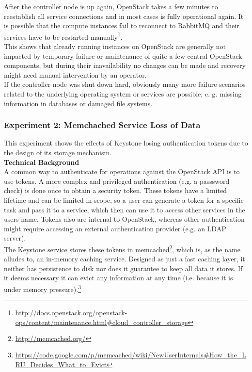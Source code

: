After the controller node is up again, OpenStack takes a few minutes to reestablish all service connections and in most cases is fully operational again. It is possible that the compute instances fail to reconnect to RabbitMQ and their services have to be restarted manually\footnote{\url{http://docs.openstack.org/openstack-ops/content/maintenance.html\#cloud_controller_storage}}. \\

This shows that already running instances on OpenStack are generally not impacted by temporary failure or maintenance of quite a few central OpenStack components, but during their inavailability no changes can be made and recovery might need manual intervention by an operator. \\

If the controller node was shut down hard, obviously many more failure scenarios related to the underlying operating system or services are possible, e. g. missing information in databases or damaged file systems.\\

\subsubsection{Experiment 2: Memchached Service Loss of Data}
This experiment shows the effects of Keystone losing authentication tokens due to the design of its storage mechanism.\\

\textbf{Technical Background}\\
A common way to authenticate for operations against the OpenStack API is to use tokens. A more complex and privileged authentication (e.g. a passsword check) is done once to obtain a security token. These tokens have a limited lifetime and can be limited in scope, so a user can generate a token for a specific task and pass it to a service, which then can use it to access other services in the users name. Tokens also are internal to OpenStack, whereas other authentication might require accessing an external authentication provider (e.g. an LDAP server).\\

The Keystone service stores these tokens in memcached\footnote{\url{http://memcached.org/}}, which is, as the name alludes to, an in-memory caching service. Designed as just a fast caching layer, it neither has persistence to disk nor does it guarantee to keep all data it stores. If it deems necessary it can evict any information at any time (i.e. because it is under memory pressure).\footnote{\url{https://code.google.com/p/memcached/wiki/NewUserInternals\#How_the_LRU_Decides_What_to_Evict}}\\


